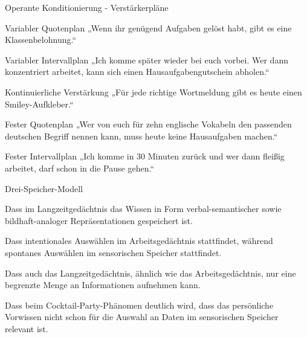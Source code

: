 \begin{mapping}{Operante Konditionierung - Verstärkerpläne}
    \begin{answer}
        Variabler Quotenplan
        \ismappedto
        „Wenn ihr genügend Aufgaben gelöst habt, gibt es eine Klassenbelohnung.“
    \end{answer}
    \begin{answer}
        Variabler Intervallplan
        \ismappedto
        „Ich komme später wieder bei euch vorbei. Wer dann konzentriert arbeitet, kann sich einen Hausaufgabengutschein abholen.“
    \end{answer}
    \begin{answer}
        Kontinuierliche Verstärkung
        \ismappedto
        „Für jede richtige Wortmeldung gibt es heute einen Smiley-Aufkleber.“
    \end{answer}
    \begin{answer}
        Fester Quotenplan
        \ismappedto
        „Wer von euch für zehn englische Vokabeln den passenden deutschen Begriff nennen kann, muss heute keine Hausaufgaben machen.“
    \end{answer}
    \begin{answer}
        Fester Intervallplan
        \ismappedto
        „Ich komme in 30 Minuten zurück und wer dann fleißig arbeitet, darf schon in die Pause gehen.“
    \end{answer}
\end{mapping}

\begin{multiple-choice}{Drei-Speicher-Modell}
    \begin{answers}
        \item[\correct] Dass im Langzeitgedächtnis das Wissen in Form verbal-semantischer sowie bildhaft-analoger Repräsentationen gespeichert ist.
        \item[\correct] Dass intentionales Auswählen im Arbeitsgedächtnis stattfindet, während spontanes Auswählen im sensorischen Speicher stattfindet.
        \item[\wrong] Dass auch das Langzeitgedächtnis, ähnlich wie das Arbeitsgedächtnis, nur eine begrenzte Menge an Informationen aufnehmen kann.
        \item[\wrong] Dass beim Cocktail-Party-Phänomen deutlich wird, dass das persönliche Vorwissen nicht schon für die Auswahl an Daten im sensorischen Speicher relevant ist.
    \end{answers}
\end{multiple-choice}

